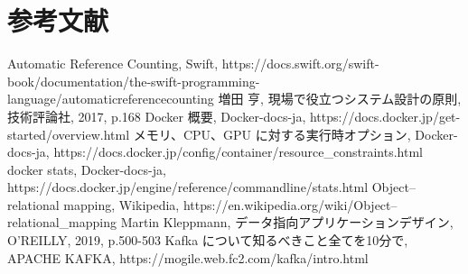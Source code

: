 \documentclass[../../main]{subfiles}
\begin{document}
    \section{参考文献}\label{sec:reference}

    \begin{thebibliography}{99}
         Automatic Reference Counting, Swift, https://docs.swift.org/swift-book/documentation/the-swift-programming-language/automaticreferencecounting
         増田 亨, 現場で役立つシステム設計の原則, 技術評論社, 2017, p.168
         Docker 概要, Docker-docs-ja, https://docs.docker.jp/get-started/overview.html
         メモリ、CPU、GPU に対する実行時オプション, Docker-docs-ja, https://docs.docker.jp/config/container/resource\_constraints.html
         docker stats, Docker-docs-ja, https://docs.docker.jp/engine/reference/commandline/stats.html
         Object–relational mapping, Wikipedia, https://en.wikipedia.org/wiki/Object–relational\_mapping
         Martin Kleppmann, データ指向アプリケーションデザイン, O'REILLY, 2019, p.500-503
         Kafka について知るべきこと全てを10分で, APACHE KAFKA, https://mogile.web.fc2.com/kafka/intro.html
    \end{thebibliography}

    \clearpage
\end{document}

